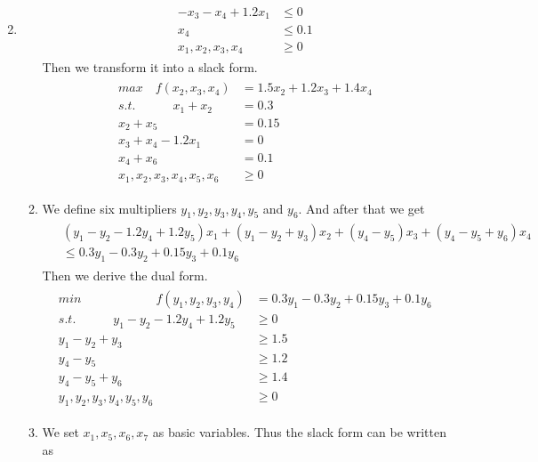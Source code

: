 \documentclass[12pt,a4paper]{article}
\makeatletter
\newtheorem*{solution}{Solution}
\theoremstyle{definition}
\renewenvironment{solution}[1][Solution] {\par\pushQED{\qed}\normalfont\topsep6\p@\@plus6\p@\relax\trivlist\item[\hskip\labelsep\bfseries#1\@addpunct{.}]\ignorespaces}{\popQED\endtrivlist\@endpefalse} \makeatother
\makeatother
\begin{document}
\begin{enumerate}
\begin{solution}
\begin{enumerate}
\begin{align*}
\begin{split}
                -x_3-x_4 +1.2x_1&\leq 0\\
                x_4 &\leq 0.1\\
                x_1,x_2,x_3,x_4&\ge 0
            \end{split}
        \end{align*}
        Then we transform it into a slack form.
        \begin{align*}
            \begin{split}
                max \quad f(x_2,x_3,x_4) &= 1.5 x_2 + 1.2x_3+1.4x_4\\
                s.t.\quad\quad\quad x_1+x_2&= 0.3\\
                x_2+x_5 &= 0.15\\
                x_3+x_4 -1.2x_1&= 0\\
                x_4 +x_6&= 0.1\\
                x_1,x_2,x_3,x_4,x_5,x_6&\ge 0
            \end{split}
        \end{align*}
        \item
        We define six multipliers $y_1,y_2,y_3,y_4,y_5$ and $y_6$. And after that we get
        \begin{align*}
            \begin{split}
                &(y_1-y_2-1.2y_4+1.2y_5)x_1+(y_1-y_2+y_3)x_2+(y_4-y_5)x_3+(y_4-y_5+y_6)x_4\\
                &\leq 0.3y_1-0.3y_2+0.15y_3+0.1y_6
            \end{split}
        \end{align*}
        Then we derive the dual form.
        \begin{align*}
            \begin{split}
                min \quad\quad\quad\quad\quad\quad f(y_1,y_2,y_3,y_4)&=0.3y_1-0.3y_2+0.15y_3+0.1y_6\\
                s.t.\quad\quad\quad
                y_1-y_2-1.2y_4+1.2y_5 &\ge0\\
                y_1-y_2+y_3&\ge 1.5\\
                y_4-y_5&\ge 1.2\\
                y_4-y_5+y_6&\ge 1.4\\
                y_1,y_2,y_3,y_4,y_5,y_6&\ge0
            \end{split}
        \end{align*}
        \item
        We set $x_1,x_5,x_6,x_7$ as basic variables. Thus the slack form can be written as

\end{enumerate}
\end{solution}
\end{enumerate}
\end{document}
